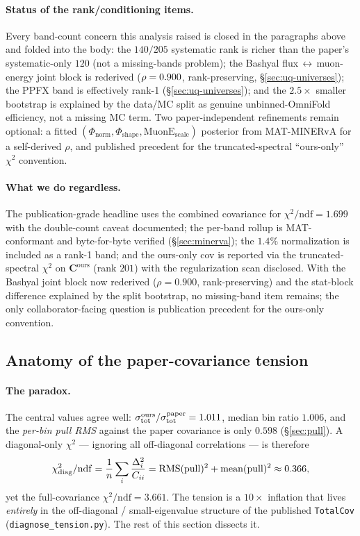 \paragraph{Status of the rank/conditioning items.}
Every band-count concern this analysis raised is closed in the paragraphs above
and folded into the body: the $140/205$ systematic rank is richer than the
paper's systematic-only $120$ (not a missing-bands problem); the Bashyal
flux\,$\leftrightarrow$\,muon-energy joint block is rederived ($\rho=0.900$,
rank-preserving, \S\ref{sec:uq-universes}); the PPFX band is effectively rank-1
(\S\ref{sec:uq-universes}); and the $2.5\times$ smaller bootstrap is explained by
the data/MC split as genuine unbinned-OmniFold efficiency, not a missing MC term.
Two paper-independent refinements remain optional: a fitted
$(\Phi_{\text{norm}},\Phi_{\text{shape}},\text{MuonE}_{\text{scale}})$ posterior
from MAT-MINERvA for a self-derived $\rho$, and published precedent for the
truncated-spectral ``ours-only'' $\chi^{2}$ convention.

\paragraph{What we do regardless.}
The publication-grade headline uses the combined covariance for
$\chi^{2}/\mathrm{ndf}=1.699$ with the double-count caveat documented;
the per-band rollup is MAT-conformant and byte-for-byte verified
(\S\ref{sec:minerva}); the $1.4\%$ normalization is included as a
rank-1 band; and the ours-only cov is reported via the truncated-spectral
$\chi^{2}$ on $\mathbf{C}^{\mathrm{ours}}$ (rank $201$) with the
regularization scan disclosed. With the Bashyal joint block now rederived
($\rho=0.900$, rank-preserving) and the stat-block difference explained by the
split bootstrap, no missing-band item remains; the only collaborator-facing
question is publication precedent for the ours-only convention.

\subsection{Anatomy of the paper-covariance tension}
\label{sec:tension}

\paragraph{The paradox.}
The central values agree well: $\sigma_{\text{tot}}^{\text{ours}}/\sigma_{\text{tot}}^{\text{paper}}
= 1.011$, median bin ratio $1.006$, and the \emph{per-bin pull RMS}
against the paper covariance is only $0.598$ (\S\ref{sec:pull}).
A diagonal-only $\chi^{2}$ --- ignoring all off-diagonal correlations ---
is therefore
\begin{equation}
\chi^{2}_{\mathrm{diag}}/\mathrm{ndf}
= \frac{1}{n}\sum_{i}\frac{\Delta_{i}^{2}}{C_{ii}}
= \mathrm{RMS}(\mathrm{pull})^{2} + \mathrm{mean}(\mathrm{pull})^{2}
\approx 0.366,
\end{equation}
yet the full-covariance $\chi^{2}/\mathrm{ndf}=3.661$. The tension is a
$10\times$ inflation that lives \emph{entirely} in the off-diagonal /
small-eigenvalue structure of the published \texttt{TotalCov}
(\texttt{diagnose\_tension.py}). The rest of this section dissects it.

